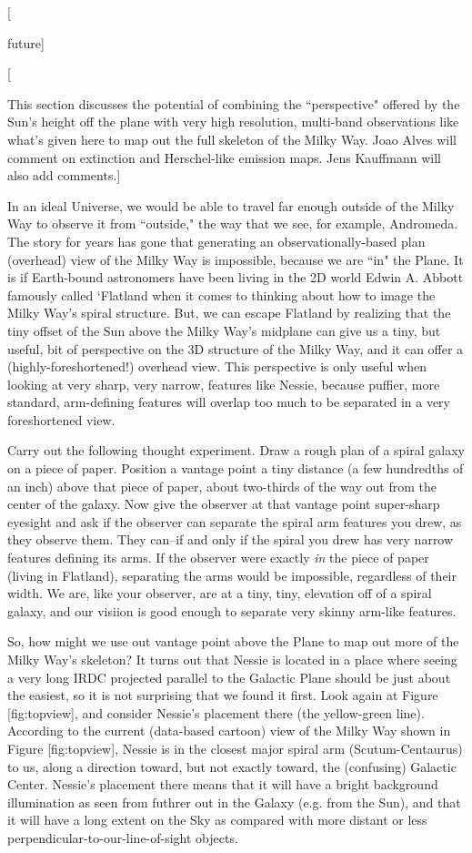 \documentclass[]{article}
\begin{document}
{[}

future{]}

{[}

This section discusses the potential of combining the ``perspective"
offered by the Sun's height off the plane with very high resolution,
multi-band observations like what's given here to map out the full
skeleton of the Milky Way. Joao Alves will comment on extinction and
Herschel-like emission maps. Jens Kauffmann will also add comments.{]}

In an ideal Universe, we would be able to travel far enough outside of
the Milky Way to observe it from ``outside," the way that we see, for
example, Andromeda. The story for years has gone that generating an
observationally-based plan (overhead) view of the Milky Way is
impossible, because we are ``in" the Plane. It is if Earth-bound
astronomers have been living in the 2D world Edwin A. Abbott famously
called `Flatland \citep{Abbott2008} when it comes to thinking about how
to image the Milky Way's spiral structure. But, we can escape Flatland
by realizing that the tiny offset of the Sun above the Milky Way's
midplane can give us a tiny, but useful, bit of perspective on the 3D
structure of the Milky Way, and it can offer a (highly-foreshortened!)
overhead view. This perspective is only useful when looking at very
sharp, very narrow, features like Nessie, because puffier, more
standard, arm-defining features will overlap too much to be separated in
a very foreshortened view.

Carry out the following thought experiment. Draw a rough plan of a
spiral galaxy on a piece of paper. Position a vantage point a tiny
distance (a few hundredths of an inch) above that piece of paper, about
two-thirds of the way out from the center of the galaxy. Now give the
observer at that vantage point super-sharp eyesight and ask if the
observer can separate the spiral arm features you drew, as they observe
them. They can--if and only if the spiral you drew has very narrow
features defining its arms. If the observer were exactly \emph{in} the
piece of paper (living in Flatland), separating the arms would be
impossible, regardless of their width. We are, like your observer, are
at a tiny, tiny, elevation off of a spiral galaxy, and our visiion is
good enough to separate very skinny arm-like features.

So, how might we use out vantage point above the Plane to map out more
of the Milky Way's skeleton? It turns out that Nessie is located in a
place where seeing a very long IRDC projected parallel to the Galactic
Plane should be just about the easiest, so it is not surprising that we
found it first. Look again at Figure {[}fig:topview{]}, and consider
Nessie's placement there (the yellow-green line). According to the
current (data-based cartoon) view of the Milky Way shown in Figure
{[}fig:topview{]}, Nessie is in the closest major spiral arm
(Scutum-Centaurus) to us, along a direction toward, but not exactly
toward, the (confusing) Galactic Center. Nessie's placement there means
that it will have a bright background illumination as seen from futhrer
out in the Galaxy (e.g. from the Sun), and that it will have a long
extent on the Sky as compared with more distant or less
perpendicular-to-our-line-of-sight objects.
\end{document}
